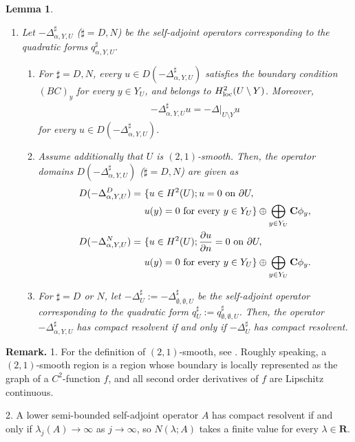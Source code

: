 \documentclass[12pt,a4paper]{article}
\newtheorem{lemma}[theorem]{Lemma}
\begin{document}
\begin{lemma}
\begin{enumerate}
 \item[(2)]
Let $-\Delta^\sharp_{\alpha,Y,U}$ ($\sharp=D,N$) be
the self-adjoint operators 
corresponding to the quadratic forms
$q^\sharp_{\alpha,Y,U}$.
\begin{enumerate}
 \item[(i)]
For $\sharp=D,N$,
every $u\in D(-\Delta^\sharp_{\alpha,Y,U})$
satisfies the boundary condition $(BC)_y$
for every $y\in Y_U$,
and belongs to $H^2_{\rm loc}(U\setminus Y)$.
Moreover,
\begin{align*}
 -\Delta^\sharp_{\alpha,Y,U}u=-\Delta|_{U\setminus Y}u
\end{align*}
for every $u\in D(-\Delta^\sharp_{\alpha,Y,U})$.

\item[(ii)]
Assume additionally that $U$ is $(2,1)$-smooth.
Then, the operator domains $D(-\Delta^\sharp_{\alpha,Y,U})$ 
($\sharp=D,N$) are given as
\begin{align}
 D(-\Delta^D_{\alpha,Y,U})
=&\ 
\{u\in H^2(U);u=0\mbox{ on }\partial U,\notag\\
&\ u(y)=0 \mbox{ for every }y\in Y_U\}
\oplus \bigoplus_{y\in Y_U}\mathbf{C}\phi_y,
\label{06_14}
\\
 D(-\Delta^N_{\alpha,Y,U})
=&\ 
\{u\in H^2(U);\frac{\partial u}{\partial n}=0\mbox{ on }\partial U,\notag\\
&\ u(y)=0 \mbox{ for every }y\in Y_U\}
\oplus \bigoplus_{y\in Y_U}\mathbf{C}\phi_y.
\label{06_15}
\end{align}

\item[(iii)]
For $\sharp=D$ or $N$,
let
$-\Delta^\sharp_U:=-\Delta^\sharp_{\emptyset,\emptyset,U}$
be the self-adjoint operator corresponding to the quadratic form
$q^\sharp_U:=q^\sharp_{\emptyset,\emptyset,U}$.
Then, 
the operator
$-\Delta^\sharp_{\alpha,Y,U}$
has compact resolvent
if and only if
$-\Delta^\sharp_U$ has compact resolvent.
\end{enumerate}
\end{enumerate}
\end{lemma}
\noindent\textbf{Remark.}
1. For the definition of $(2,1)$-smooth,
see \cite[Definition 2.7]{Wl}.
Roughly speaking, 
a $(2,1)$-smooth region is a region whose boundary is locally
represented as the graph of a $C^2$-function $f$,
and all second order derivatives of $f$ are Lipschitz continuous.

2. 
A lower semi-bounded self-adjoint operator $A$
has compact resolvent
if and only if $\lambda_j(A)\to \infty$ as $j\to \infty$,
so $N(\lambda;A)$ takes a finite value
for every $\lambda\in \mathbf{R}$.
\end{document}
